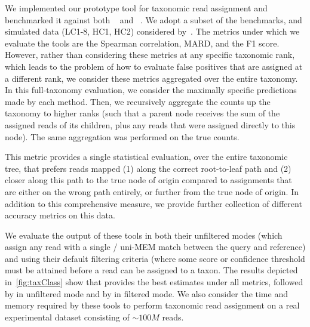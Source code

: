 We implemented our prototype tool for taxonomic read assignment and benchmarked
it against both \kraken~\citep{Wood14Kraken} and \clark~\citep{Ounit15CLARK}. We
adopt a subset of the benchmarks, and simulated data (LC1-8, HC1, HC2)
considered by~\citet{McIntyre2017}. The metrics under which we evaluate the
tools are the Spearman correlation, MARD, and the F1 score. However, rather
than considering these metrics at any specific taxonomic rank, which leads to
the problem of how to evaluate false positives that are assigned at a different
rank, we consider these metrics aggregated over the entire taxonomy. In this
full-taxonomy evaluation, we consider the maximally specific predictions made by
each method. Then, we recursively aggregate the counts up the taxonomy to higher
ranks (such that a parent node receives the sum of the assigned reads of its
children, plus any reads that were assigned directly to this node). The same
aggregation was performed on the true counts.

This metric provides a single statistical evaluation, over the entire taxonomic
tree, that prefers reads mapped (1) along the correct root-to-leaf path and (2)
closer along this path to the true node of origin compared to assignments that
are either on the wrong path entirely, or further from the true node of origin.
In addition to this comprehensive measure, we provide further collection of
different accuracy metrics on this data.

We evaluate the output of these tools in both their unfiltered modes
(which assign any read with a single \kmer / uni-MEM match between the query and reference)
and using their default filtering criteria (where some score or confidence threshold must be attained before a read can be assigned to a taxon.
The results depicted in~\cref{fig:taxClass} show that \pufferfish
provides the best estimates under all metrics, followed by \clark
in unfiltered mode and by \kraken in filtered mode. We also consider the time and memory required by these tools to perform taxonomic read assignment on a real experimental dataset consisting of $\sim100M$ reads.

